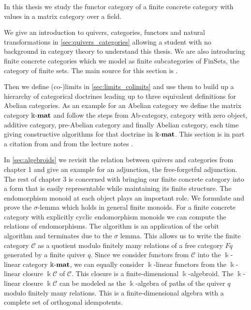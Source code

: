 In this thesis we study the functor category of a finite concrete category with values in a matrix category over a field.

We give an introduction to quivers, categories, functors and natural transformations in \cref{sec:quivers_categories} allowing a student with
no background in category theory to understand this thesis. We are also introducing finite concrete categories which we
model as finite subcategories of $\mathrm{FinSets}$, the category of finite sets.
The main source for this section is \cite[Chapter 1, Sections 1.1 - 1.4]{[context]}.

Then we define (co-)limits in \cref{sec:limits_colimits} and use them to build up a hierarchy of categorical doctrines leading up
to three equivalent definitions for Abelian categories.
As an example for an Abelian category we define the matrix category $\Bbbk\textnormal{-}\mathbf{mat}$
and follow the steps from Ab-category, category with zero object, additive category, pre-Abelian category and
finally Abelian category, each time giving constructive algorithms for that doctrine in $\Bbbk\textnormal{-}\mathbf{mat}$. This section is in part a 
citation from \cite[I.1.38-I.1.47 and I.2]{[Posur]} and from the lecture notes \cite{[AlgAlg]}.

In \cref{sec:algebroids} we revisit the relation between quivers and categories from chapter 1
and give an example for an adjunction, the free-forgetful adjunction. The rest of chapter 3 is concerned with
bringing our finite concrete category into a form that is easily representable while maintaining its finite structure.
The endomorphism monoid at each object plays an important role. We formulate and prove the $\sigma$-lemma
which holds in general finite monoids. For a finite concrete category with explicitly
cyclic endomorphism monoids we can compute the relations of endomorphisms. The algorithm is an application
of the orbit algorithm and terminates due to the $\sigma$ lemma.
This allows us to write the finite category $\mathcal{C}$ as a quotient modulo finitely many relations of a free category $Fq$
generated by a finite quiver $q$.
Since we consider functors from $\mathcal{C}$ into the $\Bbbk$-linear category $\Bbbk\textnormal{-}\mathbf{mat}$, we can equally consider $\Bbbk$-linear functors
from the $\Bbbk$-linear closure $\Bbbk\mathcal{C}$ of $\mathcal{C}$. This closure is a finite-dimensional $\Bbbk$-algebroid. 
The $\Bbbk$-linear closure $\Bbbk\mathcal{C}$ can be modeled as the $\Bbbk$-algebra of paths of the
quiver $q$ modulo finitely many relations. This is a finite-dimensional algebra with a complete set of orthogonal idempotents.

